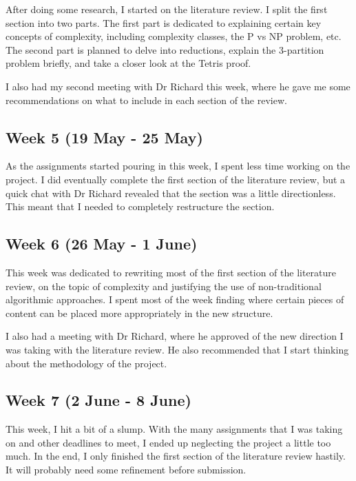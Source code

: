 \documentclass[a4paper, 12pt]{extreport}
\begin{document}
				After doing some research, I started on the literature review. I split the first section into two parts. The first part is dedicated to explaining certain key concepts of complexity, including complexity classes, the P vs NP problem, etc. The second part is planned to delve into reductions, explain the 3-partition problem briefly, and take a closer look at the Tetris proof.
				
				I also had my second meeting with Dr Richard this week, where he gave me some recommendations on what to include in each section of the review.
				
			\subsection{Week 5 (19 May - 25 May)}
			
				As the assignments started pouring in this week, I spent less time working on the project. I did eventually complete the first section of the literature review, but a quick chat with Dr Richard revealed that the section was a little directionless. This meant that I needed to completely restructure the section.
			
			\subsection{Week 6 (26 May - 1 June)}
			
				This week was dedicated to rewriting most of the first section of the literature review, on the topic of complexity and justifying the use of non-traditional algorithmic approaches. I spent most of the week finding where certain pieces of content can be placed more appropriately in the new structure.
				
				I also had a meeting with Dr Richard, where he approved of the new direction I was taking with the literature review. He also recommended that I start thinking about the methodology of the project.
			
			\subsection{Week 7 (2 June - 8 June)}
			
				This week, I hit a bit of a slump. With the many assignments that I was taking on and other deadlines to meet, I ended up neglecting the project a little too much. In the end, I only finished the first section of the literature review hastily. It will probably need some refinement before submission.
				
\end{document}
